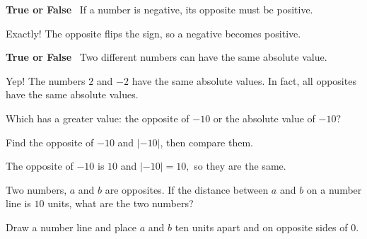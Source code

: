 \documentclass{ximera}[font=12pt]
\begin{document}
\begin{problem}
\textcolor{accessibleOrange}{\textbf{True or False}} \ If a number is negative, its opposite must be positive.

\begin{multipleChoice}
\end{multipleChoice}

\begin{feedback}[correct]
Exactly! The opposite flips the sign, so a negative becomes positive.
\end{feedback}

\end{problem}

\begin{problem}
\textcolor{accessibleOrange}{\textbf{True or False}} \ Two different numbers can have the same absolute value.

\begin{multipleChoice}
\end{multipleChoice}

\begin{feedback}[correct]
Yep! The numbers $2$ and $-2$ have the same absolute values.  In fact, all opposites have the same absolute values.
\end{feedback}

\end{problem}

\begin{problem}
Which has a greater value: the opposite of $-10$ or the absolute value of $-10?$  

\begin{multipleChoice}
\end{multipleChoice}

\begin{hint}
Find the opposite of $-10$ and $|-10|$, then compare them.
\end{hint}

\begin{feedback}[correct]
The opposite of $-10$ is $10$ and $|-10| = 10,$ so they are the same.
\end{feedback}

\end{problem}


\begin{problem}
Two numbers, $a$ and $b$ are opposites. If the distance between
$a$ and $b$ on a number line is $10$ units, what are the two numbers?

\begin{multipleChoice}
\end{multipleChoice}

\begin{hint}
Draw a number line and place $a$ and $b$ ten units apart and on opposite sides of 0.
\end{hint}

\end{problem}
\end{document}
